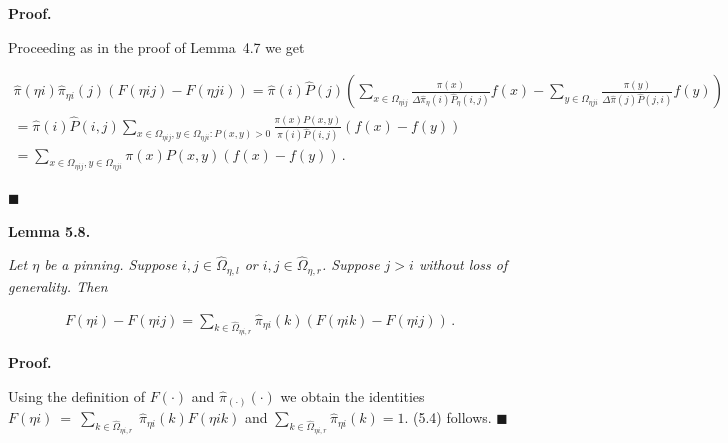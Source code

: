 \documentclass[10pt,a4paper]{article}
\begin{document}
\par\medskip\noindent\textbf{Proof.}\par



Proceeding as in the proof of Lemma 4.7 we get\par


\[\begin{gathered}
\displaystyle\hat{\pi}(\eta i)\hat{\pi}_{\eta i}(j)(F(\eta ij)-F(\eta ji)) \displaystyle=\hat{\pi}(i)\hat{P}(j)\left(\sum_{x\in\Omega_{\eta ij}}\frac{\pi(x)}{\Delta\hat{\pi}_{\eta}(i)\hat{P}_{\eta}(i,j)}f(x)-\sum_{y\in\Omega_{\eta ji}}\frac{\pi(y)}{\Delta\hat{\pi}(j)\hat{P}(j,i)}f(y)\right) \\
\displaystyle=\hat{\pi}(i)\hat{P}(i,j)\sum_{x\in\Omega_{\eta ij},y\in\Omega_{\eta ji}:P(x,y)>0}\frac{\pi(x)P(x,y)}{\hat{\pi}(i)\hat{P}(i,j)}(f(x)-f(y)) \\
\displaystyle=\sum_{x\in\Omega_{\eta ij},y\in\Omega_{\eta ji}}\pi(x)P(x,y)(f(x)-f(y))\,.
\end{gathered}\]


\ensuremath{\blacksquare}\par






\par\medskip\noindent\textbf{\textbf{Lemma 5.8}\textbf{.}}\par



\emph{Let $\eta$ be a pinning. Suppose $i,j\in\hat{\Omega}_{\eta,l}$ or $i,j\in\hat{\Omega}_{\eta,r}$. Suppose $j>i$ without loss of generality. Then}\par


\[\begin{gathered}
\displaystyle F(\eta i)-F(\eta ij) \displaystyle=\sum_{k\in\hat{\Omega}_{\eta i,r}}\hat{\pi}_{\eta i}(k)(F(\eta ik)-F(\eta ij))\,.
\end{gathered}\]






\par\medskip\noindent\textbf{Proof.}\par



Using the definition of $F(\cdot)$ and $\hat{\pi}_{(\cdot)}(\cdot)$ we obtain the identities
$F(\eta i)~=~\sum_{k\in\hat{\Omega}_{\eta i,r}}~\hat{\pi}_{\eta i}(k)F(\eta ik)$
and $\sum_{k\in\hat{\Omega}_{\eta i,r}}\hat{\pi}_{\eta i}(k)=1$. (5.4) follows.
\ensuremath{\blacksquare}\par
\end{document}
